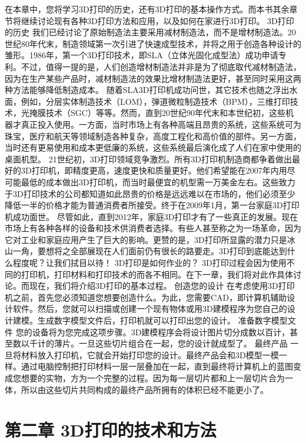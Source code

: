 \documentclass[12pt,UTF8]{ctexbook}
\begin{document}
在本章中，您将学习3D打印的历史，还有3D打印的基本操作方式。而本书其余章节将继续讨论现有各种3D打印方法和应用，以及如何在家进行3D打印。
3D打印的历史
我们已经讨论了原始制造法主要采用减材制造法，而不是增材制造法。20世纪80年代末，制造领域第一次引进了快速成型技术，并将之用于创造各种设计的雏形。1986年，第一个3D打印技术，即SLA（立体光固化成型法）成功申请专利。不过，值得一提的是，人们创造增材制造法并非是为了彻底取代减材制造法，因为在生产某些产品时，减材制造法的效果比增材制造法更好，甚至同时采用这两种方法能够降低制造成本。
随着SLA3D打印机成功问世，其它技术也随之浮出水面，例如，分层实体制造技术（LOM），弹道微粒制造技术（BPM），三维打印技术，光掩膜技术（SGC）等等。然而，直到20世纪90年代末和本世纪初，这些机器才真正投入使用。一方面，当时市场上有各种高端且昂贵的系统，这些系统可为珠宝，医疗和航天等领域制造各种复杂，高度工程化和高价值的部件。另一方面，当时还有更易使用和成本更低廉的系统，这些系统最后演化成了人们在家中使用的桌面机型。
21世纪初，3D打印领域竞争激烈。所有3D打印机制造商都争着做出最好的3D打印机，即精度更高，速度更快和质量更好。他们希望能在2007年内用尽可能最低的成本做出3D打印机，而当时最便宜的机型需一万美金左右。这些致力于3D打印技术的公司都知道如此昂贵的价格是远远难以在市场的，他们必须至少降低一半的价格才能为普通消费者所接受。终于在2009年1月，第一台家庭3D打印机成功面世。
尽管如此，直到2012年，家庭3D打印才有了一些真正的发展。现在市场上有各种各样的设备和技术供消费者选择。有些人甚至称之为一场革命，因为它对工业和家庭应用产生了巨大的影响。更赞的是，3D打印所显露的潜力只是冰山一角，要想将之全部展现在人们面前仍有很长的路要走。3D打印到底能达到什么程度呢？让我们拭目以待！
3D打印是如何作业的？
3D打印过程会因为使用不同的打印机，打印材料和打印技术的而各不相同。在下一章，我们将对此作具体讨论。而现在，我们将介绍3D打印的基本过程。
创造您的设计
在考虑使用3D打印机之前，首先您必须知道您想要创造什么。为此，您需要CAD，即计算机辅助设计软件。然后，您就可以扫描或创建一个现有物体或用3D建模程序为您自己的设计建模。生成数字模型文件后，打印机就可以打印出您的设计。
准备数字模型文件
您的设备将为您完成这项步骤。3D建模程序会将设计图片切分成数以百计，甚至数以千计的薄片。一旦这些切片组合在一起，您的设计就成型了。
最终产品
一旦将材料放入打印机，它就会开始打印您的设计。最终产品会和3D模型一模一样。通过电脑控制把打印材料一层一层叠加在一起，直到最终将计算机上的蓝图变成您想要的实物，方为一个完整的过程。因为每一层切片都和上一层切片合为一体，所以由这些切片共同构成的最终产品所拥有的体积已经不能更小了。

\chapter{第二章 3D打印的技术和方法}
\end{document}
